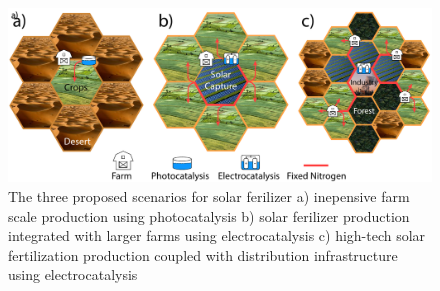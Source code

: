 \begin{figure}
    \centering
    \includegraphics[width=\textwidth]{Figures/solar_fertilizer_scenarios.pdf}
    \caption{The three proposed scenarios for solar ferilizer a) inepensive farm scale production using photocatalysis b) solar ferilizer production integrated with larger farms using electrocatalysis c) high-tech solar fertilization production coupled with distribution infrastructure using electrocatalysis}
    \label{fig:scenarios}
\end{figure}

